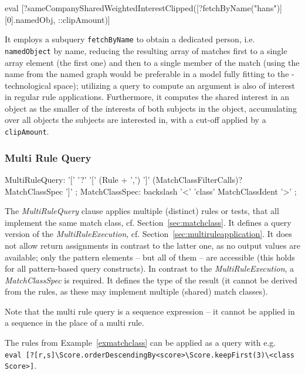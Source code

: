 \begin{example}
  \begin{grshell}
eval [?sameCompanySharedWeightedInterestClipped([?fetchByName("hans")][0].namedObj, ::clipAmount)]
  \end{grshell}
	
It employs a subquery \texttt{fetchByName} to obtain a dedicated person, i.e. \texttt{namedObject} by name, reducing the resulting array of matches first to a single array element (the first one) and then to a single member of the match (using the name from the named graph would be preferable in a model fully fitting to the \GrG-technological space); utilizing a query to compute an argument is also of interest in regular rule applications.
Furthermore, it computes the shared interest in an object as the smaller of the interests of both subjects in the object, accumulating over all objects the subjects are interested in, with a cut-off applied by a \texttt{clipAmount}.
\end{example}

\subsubsection*{Multi Rule Query}

\begin{rail}
  MultiRuleQuery: '[' '?' '[' (Rule + ',') ']' (MatchClassFilterCalls)? MatchClassSpec ']' ;
  MatchClassSpec: backslash '<' 'class' MatchClassIdent '>' ;
\end{rail}

The \emph{MultiRuleQuery} clause applies multiple (distinct) rules or tests, that all implement the same match class, cf. Section~\ref{sec:matchclass}.
It defines a query version of the \emph{MultiRuleExecution}, cf. Section~\ref{sec:multiruleapplication}.
It does not allow return assignments in contrast to the latter one, as no output values are available; only the pattern elements -- but all of them -- are accessible (this holds for all pattern-based query constructs).
In contrast to the \emph{MultiRuleExecution}, a \emph{MatchClassSpec} is required.
It defines the type of the result (it cannot be derived from the rules, as these may implement multiple (shared) match classes).

Note that the multi rule query is a sequence expression -- it cannot be applied in a sequence in the place of a multi rule.

\begin{example}
The rules from Example~\ref{exmatchclass} can be applied as a query with e.g. \\
\verb#eval [?[r,s]\Score.orderDescendingBy<score>\Score.keepFirst(3)\<class Score>]#.
\end{example}


